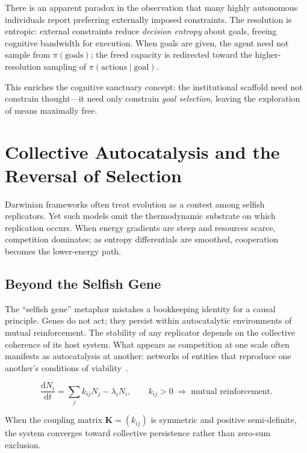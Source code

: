 \documentclass[12pt,a4paper]{article}
\theoremstyle{definition}
\newcommand{\ddt}[1]{\frac{\mathrm{d}#1}{\mathrm{d}t}}
\begin{document}
There is an apparent paradox in the observation that many highly autonomous
individuals report preferring externally imposed constraints.  The resolution
is entropic: external constraints reduce \emph{decision entropy} about goals,
freeing cognitive bandwidth for execution.  When goals are given, the agent
need not sample from $\pi(\text{goals})$; the freed capacity is redirected
toward the higher-resolution sampling of $\pi(\text{actions} \mid \text{goal})$.

This enriches the cognitive sanctuary concept: the institutional scaffold need
not constrain thought---it need only constrain \emph{goal selection}, leaving
the exploration of means maximally free.

\section{Collective Autocatalysis and the Reversal of Selection}
\label{sec:autocatalysis}

Darwinian frameworks often treat evolution as a contest among selfish
replicators.  Yet such models omit the thermodynamic substrate on which
replication occurs.  When energy gradients are steep and resources scarce,
competition dominates; as entropy differentials are smoothed, cooperation
becomes the lower-energy path.

\subsection{Beyond the Selfish Gene}

The ``selfish gene'' metaphor mistakes a bookkeeping identity for a causal
principle.  Genes do not act; they persist within autocatalytic environments
of mutual reinforcement.  The stability of any replicator depends on the
collective coherence of its host system.  What appears as competition at one
scale often manifests as autocatalysis at another: networks of entities that
reproduce one another's conditions of viability~\citep{capraluisi2021,morin2008}.

\begin{equation}
  \ddt{N_i} = \sum_j k_{ij} N_j - \lambda_i N_i,
  \qquad k_{ij} > 0 \;\Longrightarrow\; \text{mutual reinforcement.}
  \label{eq:autocatalysis}
\end{equation}

When the coupling matrix $\mathbf{K} = (k_{ij})$ is symmetric and positive
semi-definite, the system converges toward collective persistence rather than
zero-sum exclusion.
\end{document}
